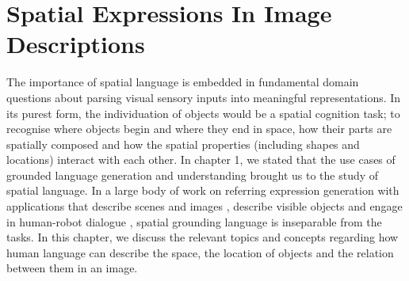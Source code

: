 \chapter{Spatial Expressions In Image Descriptions}
\label{sec:spatial}


The importance of spatial language is embedded in fundamental domain questions about parsing visual sensory inputs into meaningful representations. 
In its purest form, the individuation of objects would be a spatial cognition task; 
to recognise where objects begin and where they end in space, how their parts are spatially composed and how the spatial properties (including shapes and locations) interact with each other.  
In chapter 1, we stated that the use cases of grounded language generation and understanding brought us to the study of spatial language. In a large body of work on referring expression generation 
\citep{DaleReiter:1995,Krahmer:2011aa} with applications that describe scenes \citep{Viethen:2008aa} and images  \citep{Mitchell:2012aa,elliott2013image}, describe visible objects  \citep{mitchell-etal-2013-generating} and engage in human-robot dialogue \citep{kelleher-kruijff-2006-incremental,Dobnik:2009dz}, spatial grounding language is inseparable from the tasks. 
In this chapter, we discuss the relevant topics and concepts regarding how human language can describe the space, the location of objects and the relation between them in an image.

